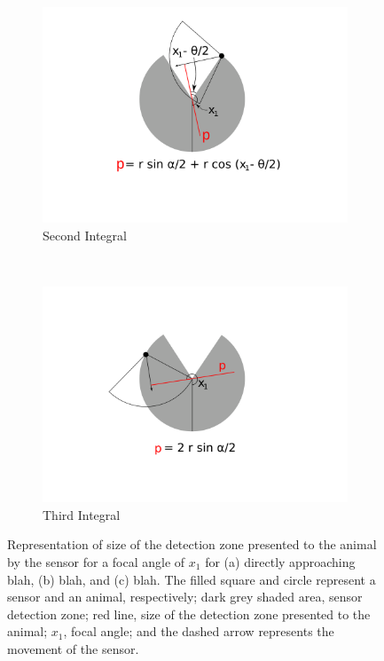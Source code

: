 \documentclass[a4paper,10pt,reqno,oneside]{amsart}
\begin{document}
\begin{figure}[t]
	\begin{subfigure}[t]{0.45\textwidth}
                \centering
		\includegraphics[width=1\textwidth, trim= 6cm 1cm 6cm 0.3cm]{imgs/secondIntegral.pdf}
                \caption{Second Integral}
                \label{f:secondInt}
        \end{subfigure}%
	~ 
	\begin{subfigure}[t]{0.45\textwidth}
                \centering
		\includegraphics[width=1\textwidth, trim= 6cm 1cm 6cm 0.3cm]{imgs/thirdIntegral.pdf}
                \caption{Third Integral}
                \label{f:thirdInt}
        \end{subfigure}%
\label{f:x1AndInt}
\caption{Representation of size of the detection zone presented to the animal by the sensor for a focal angle of $x_1$ for (a) directly approaching blah, (b) blah, and (c) blah. The filled square and circle represent a sensor and an animal, respectively; dark grey shaded area, sensor detection zone; red line, size of the detection zone presented to the animal; $x_1$, focal angle; and the dashed arrow represents the movement of the sensor.}
\end{figure}
\end{document}
